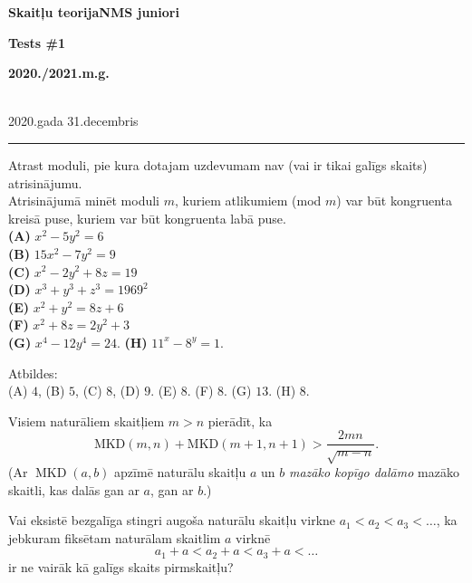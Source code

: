 \documentclass[a4paper,12pt]{article}
\begin{document}
\begin{center}
\parbox{3.5cm}{\flushleft\bf Skaitļu teorija\linebreak NMS juniori} \hfill {\bf\LARGE Tests \#1} \hfill \parbox{3.5cm}{\flushright\bf 2020./2021.m.g.} \\[2pt]
\rm\small 2020.gada 31.decembris
\end{center}

\hrule

\vspace{20pt}


\vspace{20pt}
\begin{problem}
Atrast moduli, pie kura dotajam uzdevumam nav 
(vai ir tikai galīgs skaits) atrisinājumu.\\
Atrisinājumā minēt moduli $m$, kuriem atlikumiem (mod $m$) 
var būt kongruenta kreisā puse, kuriem var būt kongruenta labā puse.\\
{\bf (A)} $x^2 - 5y^2 = 6$\\
{\bf (B)} $15x^2 - 7y^2 = 9$\\
{\bf (C)} $x^2 - 2y^2 + 8z = 19$\\
{\bf (D)} $x^3 + y^3 + z^3 = 1969^2$\\
{\bf (E)} $x^2 + y^2 = 8z + 6$\\
{\bf (F)} $x^2 + 8z = 2y^2 + 3$\\
{\bf (G)} $x^4 - 12y^4 = 24$. 
{\bf (H)} $11^x - 8^y = 1$. 
\end{problem}

Atbildes:\\
(A) $4$, (B) $5$, (C) $8$, (D) $9$. (E) $8$. (F) $8$. (G) $13$. (H) $8$. 






\vspace{20pt}
\begin{problem} 
Visiem naturāliem skaitļiem $m > n$ pierādīt, ka
$$\mbox{MKD}(m,n) + \mbox{MKD}(m+1,n+1) > \frac{2mn}{\sqrt{m-n}}.$$
(Ar $\operatorname{MKD}(a,b)$ apzīmē naturālu skaitļu $a$ un $b$ {\em mazāko 
kopīgo dalāmo} \textendash{} mazāko skaitli, kas dalās gan ar $a$, gan ar $b$.)
\end{problem}

\vspace{20pt}
\begin{problem}
Vai eksistē bezgalīga
stingri augoša naturālu skaitļu virkne $a_1 < a_2 < a_3 <\ldots$,
ka jebkuram fiksētam naturālam skaitlim $a$ virknē 
$$a_1+a < a_2+a < a_3 + a < \ldots$$
ir ne vairāk kā galīgs skaits pirmskaitļu?
\end{problem}
\end{document}
